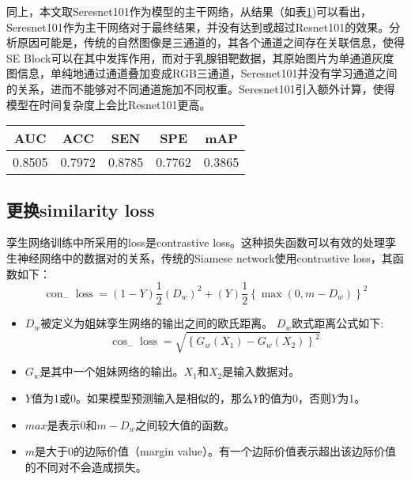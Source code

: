 同上，本文取Seresnet101作为模型的主干网络，从结果（如表\ref{tab:1_stage_senet_pred_result})可以看出，Seresnet101作为主干网络对于最终结果，并没有达到或超过Resnet101的效果。分析原因可能是，传统的自然图像是三通道的，其各个通道之间存在关联信息，使得SE Block可以在其中发挥作用，而对于乳腺钼靶数据，其原始图片为单通道灰度图信息，单纯地通过通道叠加变成RGB三通道，Seresnet101并没有学习通道之间的关系，进而不能够对不同通道施加不同权重。Seresnet101引入额外计算，使得模型在时间复杂度上会比Resnet101更高。
\begin{table}[!htbp]
    \label{tab:1_stage_senet_pred_result}
    \centering
    \footnotesize%
    \setlength{\tabcolsep}{4pt}%
    \renewcommand{\arraystretch}{1.2}%
    \begin{tabular}{ccccc}
        \hline
        AUC& ACC &SEN &SPE &mAP \\
        \hline
        0.8505 &0.7972 &0.8785  &0.7762 &0.3865 \\
        \hline
    \end{tabular}
\end{table}

\subsection{更换similarity loss}
孪生网络训练中所采用的loss是contrastive loss。这种损失函数可以有效的处理孪生神经网络中的数据对的关系，传统的Siamese network使用contrastive loss，其函数如下：
\begin{equation}
	\operatorname{con}_{-} \operatorname{loss}=(1-Y) \frac{1}{2}\left(D_{w}\right)^{2}+(Y) \frac{1}{2}\left\{\max \left(0, m-D_{w}\right)\right\}^{2}
\end{equation}

\begin{itemize}
	\item $D_{w}$被定义为姐妹孪生网络的输出之间的欧氏距离。 $D_{w}$欧式距离公式如下:
		\begin{equation}
			\cos _{-} \operatorname{loss}=\sqrt{\left\{G_{w}\left(X_{1}\right)-G_{w}\left(X_{2}\right)\right\}^{2}}
		\end{equation}
	\item $G_{w}$是其中一个姐妹网络的输出。$X_{1}$和$X_{2}$是输入数据对。
	\item $Y$值为1或0。如果模型预测输入是相似的，那么$Y$的值为0，否则$Y$为1。
	\item $max$是表示0和$m-D_{w}$之间较大值的函数。
	\item $m$是大于0的边际价值（margin value）。有一个边际价值表示超出该边际价值的不同对不会造成损失。
	
\end{itemize}

